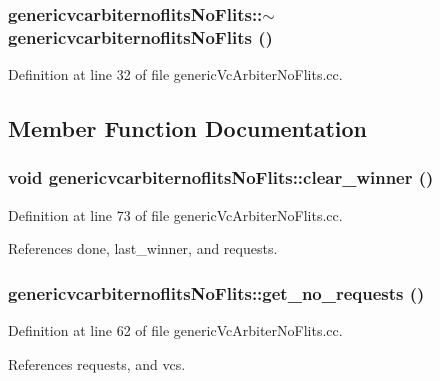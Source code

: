 \subsubsection[{$\sim$genericvcarbiternoflitsNoFlits}]{\setlength{\rightskip}{0pt plus 5cm}genericvcarbiternoflitsNoFlits::$\sim$genericvcarbiternoflitsNoFlits ()}\label{classgenericvcarbiternoflitsNoFlits_337ead5b3dee13995af1c6636f7f3670}




Definition at line 32 of file genericVcArbiterNoFlits.cc.

\subsection{Member Function Documentation}
\subsubsection[{clear\_\-winner}]{\setlength{\rightskip}{0pt plus 5cm}void genericvcarbiternoflitsNoFlits::clear\_\-winner ()}\label{classgenericvcarbiternoflitsNoFlits_27217b32212845d3c7e3dfe4a87715c4}




Definition at line 73 of file genericVcArbiterNoFlits.cc.

References done, last\_\-winner, and requests.
\subsubsection[{get\_\-no\_\-requests}]{ genericvcarbiternoflitsNoFlits::get\_\-no\_\-requests ()}\label{classgenericvcarbiternoflitsNoFlits_21ef6c560a4408fb9233416f384ec434}




Definition at line 62 of file genericVcArbiterNoFlits.cc.

References requests, and vcs.
